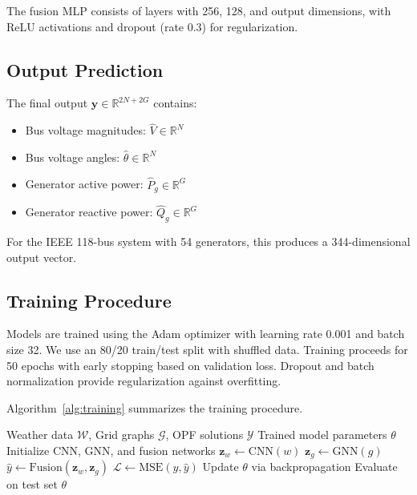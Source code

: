 \documentclass[journal,12pt,onecolumn]{IEEEtran}
\begin{document}
The fusion MLP consists of layers with 256, 128, and output dimensions, with ReLU activations and dropout (rate 0.3) for regularization.

\subsection{Output Prediction}

The final output $\mathbf{y} \in \mathbb{R}^{2N + 2G}$ contains:

\begin{itemize}
    \item Bus voltage magnitudes: $\hat{V} \in \mathbb{R}^{N}$
    \item Bus voltage angles: $\hat{\theta} \in \mathbb{R}^{N}$
    \item Generator active power: $\hat{P}_g \in \mathbb{R}^{G}$
    \item Generator reactive power: $\hat{Q}_g \in \mathbb{R}^{G}$
\end{itemize}

For the IEEE 118-bus system with 54 generators, this produces a 344-dimensional output vector.

\subsection{Training Procedure}

Models are trained using the Adam optimizer with learning rate 0.001 and batch size 32. We use an 80/20 train/test split with shuffled data. Training proceeds for 50 epochs with early stopping based on validation loss. Dropout and batch normalization provide regularization against overfitting.

Algorithm~\ref{alg:training} summarizes the training procedure.

\begin{algorithm}
\caption{Multi-Modal Training Procedure}
\label{alg:training}
\begin{algorithmic}[1]
\REQUIRE Weather data $\mathcal{W}$, Grid graphs $\mathcal{G}$, OPF solutions $\mathcal{Y}$
\ENSURE Trained model parameters $\theta$
\STATE Initialize CNN, GNN, and fusion networks
        \STATE $\mathbf{z}_w \leftarrow \text{CNN}(w)$ 
        \STATE $\mathbf{z}_g \leftarrow \text{GNN}(g)$ 
        \STATE $\hat{y} \leftarrow \text{Fusion}(\mathbf{z}_w, \mathbf{z}_g)$ 
        \STATE $\mathcal{L} \leftarrow \text{MSE}(y, \hat{y})$
        \STATE Update $\theta$ via backpropagation
    \ENDFOR
    \STATE Evaluate on test set
\ENDFOR
\RETURN $\theta$
\end{algorithmic}
\end{algorithm}
\end{document}
